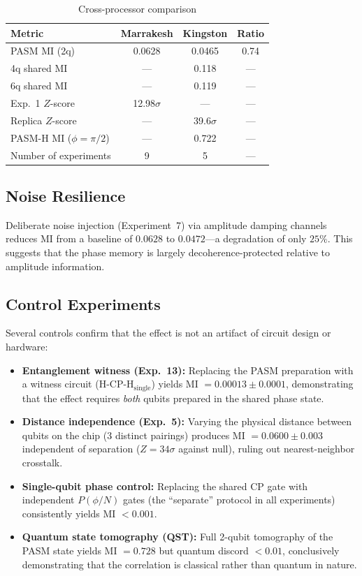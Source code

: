 \documentclass[12pt,a4paper]{article}
\begin{document}
\begin{table}[ht]
\centering
\caption{Cross-processor comparison}
\label{tab:cross}
\begin{tabular}{lccc}
\toprule
Metric & Marrakesh & Kingston & Ratio \\
\midrule
PASM MI (2q) & 0.0628 & 0.0465 & 0.74 \\
4q shared MI & --- & 0.118 & --- \\
6q shared MI & --- & 0.119 & --- \\
Exp.~1 $Z$-score & 12.98$\sigma$ & --- & --- \\
Replica $Z$-score & --- & 39.6$\sigma$ & --- \\
PASM-H MI ($\phi=\pi/2$) & --- & 0.722 & --- \\
Number of experiments & 9 & 5 & --- \\
\bottomrule
\end{tabular}
\end{table}

\subsection{Noise Resilience}

Deliberate noise injection (Experiment~7) via amplitude damping channels reduces MI from a baseline of $0.0628$ to $0.0472$---a degradation of only $25\%$. This suggests that the phase memory is largely decoherence-protected relative to amplitude information.

\subsection{Control Experiments}

Several controls confirm that the effect is not an artifact of circuit design or hardware:

\begin{itemize}
\item \textbf{Entanglement witness (Exp.~13):} Replacing the PASM preparation with a witness circuit (H-CP-H$_{\text{single}}$) yields MI $= 0.00013 \pm 0.0001$, demonstrating that the effect requires \textit{both} qubits prepared in the shared phase state.
\item \textbf{Distance independence (Exp.~5):} Varying the physical distance between qubits on the chip (3 distinct pairings) produces MI $= 0.0600 \pm 0.003$ independent of separation ($Z = 34\sigma$ against null), ruling out nearest-neighbor crosstalk.
\item \textbf{Single-qubit phase control:} Replacing the shared CP gate with independent $P(\phi/N)$ gates (the ``separate'' protocol in all experiments) consistently yields MI $< 0.001$.
\item \textbf{Quantum state tomography (QST):} Full 2-qubit tomography of the PASM state yields MI $= 0.728$ but quantum discord $< 0.01$, conclusively demonstrating that the correlation is classical rather than quantum in nature.
\end{itemize}
\end{document}
